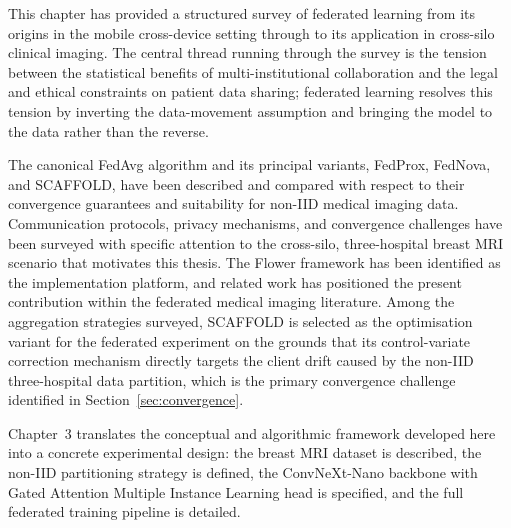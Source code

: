This chapter has provided a structured survey of federated
learning from its origins in the mobile cross-device setting
through to its application in cross-silo clinical imaging.
The central thread running through the survey is the tension
between the statistical benefits of multi-institutional
collaboration and the legal and ethical constraints on patient
data sharing; federated learning resolves this tension by
inverting the data-movement assumption and bringing the model
to the data rather than the reverse.

The canonical FedAvg algorithm and its principal variants,
FedProx, FedNova, and SCAFFOLD, have been described and
compared with respect to their convergence guarantees and
suitability for non-IID medical imaging data.
Communication protocols, privacy mechanisms, and convergence
challenges have been surveyed with specific attention to the
cross-silo, three-hospital breast MRI scenario that motivates
this thesis.
The Flower framework has been identified as the implementation
platform, and related work has positioned the present
contribution within the federated medical imaging literature.
Among the aggregation strategies surveyed,
SCAFFOLD \cite{karimireddy2020scaffold} is selected as
the optimisation variant for the federated experiment on
the grounds that its control-variate correction mechanism
directly targets the client drift caused by the non-IID
three-hospital data partition, which is the primary
convergence challenge identified in
Section~\ref{sec:convergence}.

Chapter~3 translates the conceptual and algorithmic framework
developed here into a concrete experimental design: the
breast MRI dataset is described, the non-IID partitioning
strategy is defined, the ConvNeXt-Nano backbone with Gated
Attention Multiple Instance Learning head is specified,
and the full federated training pipeline is detailed.
